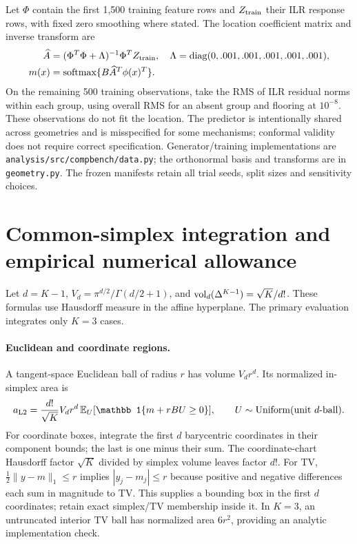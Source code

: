 Let $\Phi$ contain the first 1,500 training feature rows and $Z_{\rm train}$ their ILR response rows, with fixed zero smoothing where stated. The location coefficient matrix and inverse transform are
\begin{equation}
 \begin{aligned}
 \widehat A&=(\Phi^T\Phi+\Lambda)^{-1}\Phi^TZ_{\rm train},\quad
 \Lambda=\operatorname{diag}(0,.001,.001,.001,.001,.001),\\
 m(x)&=\operatorname{softmax}\{B\widehat A^T\phi(x)^T\}.
 \end{aligned}
 \label{eq:ridge}
\end{equation}
On the remaining 500 training observations, take the RMS of ILR residual norms within each group, using overall RMS for an absent group and flooring at $10^{-8}$. These observations do not fit the location. The predictor is intentionally shared across geometries and is misspecified for some mechanisms; conformal validity does not require correct specification. Generator/training implementations are \texttt{analysis/src/compbench/data.py}; the orthonormal basis and transforms are in \texttt{geometry.py}. The frozen manifests retain all trial seeds, split sizes and sensitivity choices.

\section{Common-simplex integration and empirical numerical allowance}
\label{app:integration}
Let $d=K-1$, $V_d=\pi^{d/2}/\Gamma(d/2+1)$, and $\operatorname{vol}_d(\Delta^{K-1})=\sqrt K/d!$. These formulas use Hausdorff measure in the affine hyperplane. The primary evaluation integrates only $K=3$ cases.

\paragraph{Euclidean and coordinate regions.}
A tangent-space Euclidean ball of radius $r$ has volume $V_dr^d$. Its normalized in-simplex area is
\begin{equation}
 a_{\rm L2}=\frac{d!}{\sqrt K}V_dr^d\,\mathbb E_U[\mathbb1\{m+rBU\geq0\}],\qquad U\sim\mathrm{Uniform}(\text{unit }d\text{-ball}).
 \label{eq:l2-integral}
\end{equation}
For coordinate boxes, integrate the first $d$ barycentric coordinates in their component bounds; the last is one minus their sum. The coordinate-chart Hausdorff factor $\sqrt K$ divided by simplex volume leaves factor $d!$. For TV, $\tfrac12\|y-m\|_1\leq r$ implies $|y_j-m_j|\leq r$ because positive and negative differences each sum in magnitude to TV. This supplies a bounding box in the first $d$ coordinates; retain exact simplex/TV membership inside it. In $K=3$, an untruncated interior TV ball has normalized area $6r^2$, providing an analytic implementation check.

